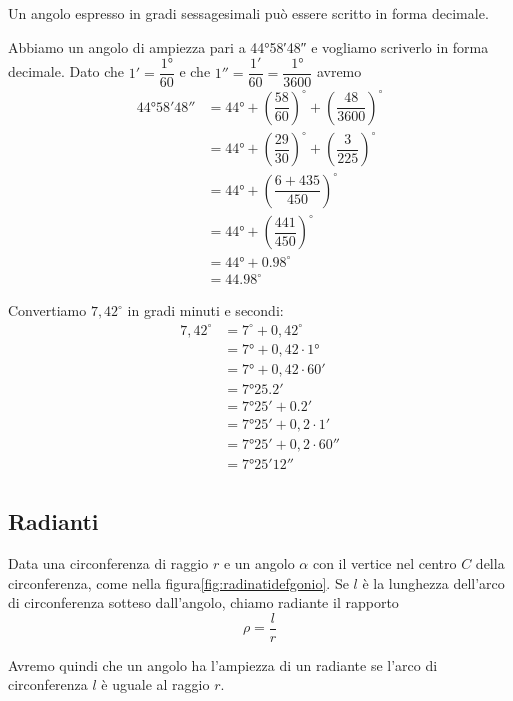 Un angolo espresso in gradi sessagesimali può essere scritto in forma decimale. 
\begin{esempio}
 Abbiamo un angolo di ampiezza pari a \ang{44;58;48} e vogliamo scriverlo in forma decimale.   Dato che $\ang{;1;}=\dfrac{\ang{1}}{60}$ e che $\ang{;;1}=\dfrac{\ang{;1;}}{60}=\dfrac{\ang{1}}{3600}$  avremo
\begin{align*}
	\ang{44;58;48}&=\ang{44}+\left(\dfrac{58}{60}\right)^{\circ}+\left(\dfrac{48}{3600} \right)^{\circ}\\
	&=\ang{44}+\left(\dfrac{29}{30}\right)^{\circ}+\left(\dfrac{3}{225} \right)^{\circ}\\
	&=\ang{44}+\left(\dfrac{6+435}{450} \right)^{\circ}\\
	&=\ang{44}+\left(\dfrac{441}{450} \right)^{\circ}\\
	&=\ang{44}+\num{0,98}^{\circ}\\
	&=\num{44,98}^{\circ}
\end{align*}
\end{esempio}
\begin{esempio}
Convertiamo $7,42^{\circ}$ in gradi minuti e secondi:
\begin{align*}
	7,42^{\circ}&=7^{\circ}+0,42^{\circ}\\
	&=\ang{7}+0,42\cdot \ang{1}\\
	&=\ang{7}+0,42\cdot \ang{;60;}\\
	&=\ang{7;25,2;}\\
	&=\ang{7;25;}+\ang{;0,2;}\\
	&=\ang{7;25;}+0,2\cdot\ang{;1;}\\
	&=\ang{7;25;}+0,2\cdot\ang{;;60}\\
	&=\ang{7;25;12}\\
\end{align*} 
\end{esempio}
\subsection{Radianti}
\begin{definizione}[Radiante]
Data una circonferenza di raggio $r$ e  un angolo $\alpha$ con il vertice nel centro $C$ della circonferenza, come nella figura\nobs\vref{fig:radinatidefgonio}. Se $l$ è la lunghezza dell'arco di circonferenza sotteso dall'angolo, chiamo radiante il rapporto \[\rho=\dfrac{l}{r} \]
\end{definizione}

Avremo quindi che un angolo ha l'ampiezza di un radiante se l'arco di circonferenza $l$ è uguale al raggio $r$.

